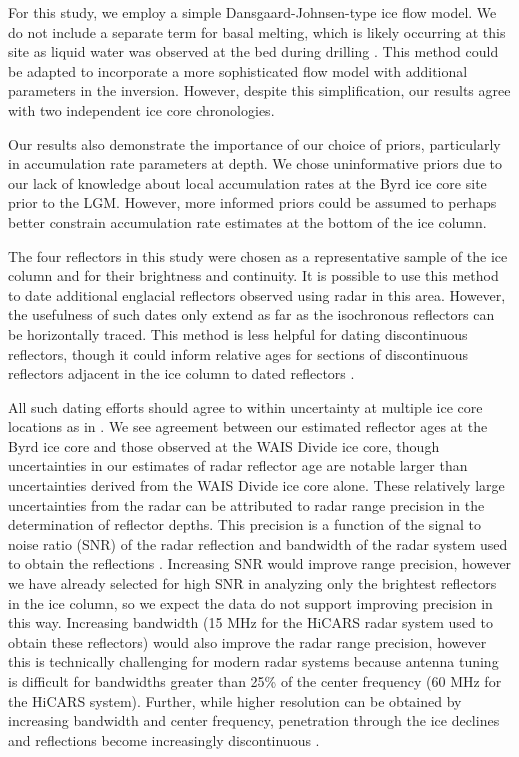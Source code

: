 For this study, we employ a simple Dansgaard-Johnsen-type ice flow model. We do not include a separate term for basal melting, which is likely occurring at this site as liquid water was observed at the bed during drilling \citep{gow1968}. This method could be adapted to incorporate a more sophisticated flow model with additional parameters in the inversion. However, despite this simplification, our results agree with two independent ice core chronologies.

Our results also demonstrate the importance of our choice of priors, particularly in accumulation rate parameters at depth. We chose uninformative priors due to our lack of knowledge about local accumulation rates at the Byrd ice core site prior to the LGM. However, more informed priors could be assumed to perhaps better constrain accumulation rate estimates at the bottom of the ice column. 

The four reflectors in this study were chosen as a representative sample of the ice column and for their brightness and continuity. It is possible to use this method to date additional englacial reflectors observed using radar in this area. However, the usefulness of such dates only extend as far as the isochronous reflectors can be horizontally traced. This method is less helpful for dating discontinuous reflectors, though it could inform relative ages for sections of discontinuous reflectors adjacent in the ice column to dated reflectors \citep{macgregor2015}.

All such dating efforts should agree to within uncertainty at multiple ice core locations as in \citet{cavitte2016}. We see agreement between our estimated reflector ages at the Byrd ice core and those observed at the WAIS Divide ice core, though uncertainties in our estimates of radar reflector age are notable larger than uncertainties derived from the WAIS Divide ice core alone. These relatively large uncertainties from the radar can be attributed to radar range precision in the determination of reflector depths. This precision is a function of the signal to noise ratio (SNR) of the radar reflection and bandwidth of the radar system used to obtain the reflections \cite{cavitte2016}. Increasing SNR would improve range precision, however we have already selected for high SNR in analyzing only the brightest reflectors in the ice column, so we expect the data do not support improving precision in this way. Increasing bandwidth (15 MHz for the HiCARS radar system used to obtain these reflectors) would also improve the radar range precision, however this is technically challenging for modern radar systems because antenna tuning is difficult for bandwidths greater than 25\% of the center frequency (60 MHz for the HiCARS system). Further, while higher resolution can be obtained by increasing bandwidth and center frequency, penetration through the ice declines and reflections become increasingly discontinuous \citep{cavitte2016}.

